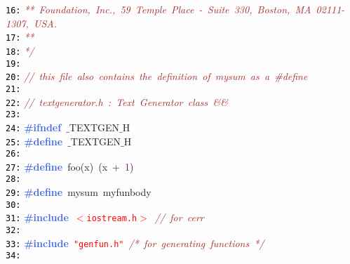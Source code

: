 \documentclass{article}
\begin{document}
\mbox{}\texttt{\textcolor{Black}{16:}} \textit{\textcolor{Brown}{**\ Foundation,\ Inc.,\ 59\ Temple\ Place\ -\ Suite\ 330,\ Boston,\ MA\ 02111-1307,\ USA.}} \\
\mbox{}\texttt{\textcolor{Black}{17:}} \textit{\textcolor{Brown}{**\ \ }} \\
\mbox{}\texttt{\textcolor{Black}{18:}} \textit{\textcolor{Brown}{*/}} \\
\mbox{}\texttt{\textcolor{Black}{19:}}  \\
\mbox{}\texttt{\textcolor{Black}{20:}} \textit{\textcolor{Brown}{//\ this\ file\ also\ contains\ the\ definition\ of\ mysum\ as\ a\ \#define}} \\
\mbox{}\texttt{\textcolor{Black}{21:}}  \\
\mbox{}\texttt{\textcolor{Black}{22:}} \textit{\textcolor{Brown}{//\ textgenerator.h\ :\ Text\ Generator\ class\ \&\&}} \\
\mbox{}\texttt{\textcolor{Black}{23:}}  \\
\mbox{}\texttt{\textcolor{Black}{24:}} \textbf{\textcolor{RoyalBlue}{\#ifndef}}\ $\_$TEXTGEN$\_$H \\
\mbox{}\texttt{\textcolor{Black}{25:}} \textbf{\textcolor{RoyalBlue}{\#define}}\ \label{test.h:25}$\_$TEXTGEN$\_$H \\
\mbox{}\texttt{\textcolor{Black}{26:}}  \\
\mbox{}\texttt{\textcolor{Black}{27:}} \textbf{\textcolor{RoyalBlue}{\#define}}\ \label{test.h:27}foo\textcolor{BrickRed}{(}x\textcolor{BrickRed}{)}\ \textcolor{BrickRed}{(}x\ \textcolor{BrickRed}{+}\ \textcolor{Purple}{1}\textcolor{BrickRed}{)} \\
\mbox{}\texttt{\textcolor{Black}{28:}}  \\
\mbox{}\texttt{\textcolor{Black}{29:}} \textbf{\textcolor{RoyalBlue}{\#define}}\ \label{test.h:29}mysum\ myfunbody\  \\
\mbox{}\texttt{\textcolor{Black}{30:}}  \\
\mbox{}\texttt{\textcolor{Black}{31:}} \textbf{\textcolor{RoyalBlue}{\#include}}\ \texttt{\textcolor{Red}{$<$iostream.h$>$}}\ \textit{\textcolor{Brown}{//\ for\ cerr}} \\
\mbox{}\texttt{\textcolor{Black}{32:}}  \\
\mbox{}\texttt{\textcolor{Black}{33:}} \textbf{\textcolor{RoyalBlue}{\#include}}\ \texttt{\textcolor{Red}{"{}genfun.h"{}}}\ \textit{\textcolor{Brown}{/*\ for\ generating\ functions\ */}} \\
\mbox{}\texttt{\textcolor{Black}{34:}}  \\
\end{document}
